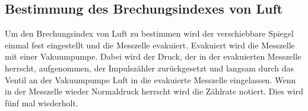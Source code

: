 \subsection{Bestimmung des Brechungsindexes von Luft}

\begin{flushleft}
    Um den Brechungsindex von Luft zu bestimmen wird der verschiebbare Spiegel einmal fest eingestellt und die Messzelle evakuiert.
    Evakuiert wird die Messzelle mit einer Vakuumpumpe.
    Dabei wird der Druck, der in der evakuierten Messzelle herrscht, aufgenommen, der Impulszähler zurückgesetzt und langsam durch das Ventil an der Vakuumpumpe Luft in die evakuierte Messzelle eingelassen.
    Wenn in der Messzelle wieder Normaldruck herrscht wird die Zählrate notiert.
    Dies wird fünf mal wiederholt.
\end{flushleft}